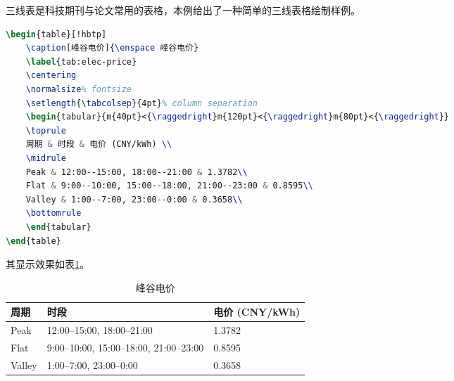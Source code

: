 \begin{example}三线表是科技期刊与论文常用的表格，本例给出了一种简单的三线表格绘制样例。
\begin{lstlisting}[language=tex]
\begin{table}[!hbtp]
    \caption[峰谷电价]{\enspace 峰谷电价}
    \label{tab:elec-price}
    \centering
    \normalsize% fontsize 
    \setlength{\tabcolsep}{4pt}% column separation
    \begin{tabular}{m{40pt}<{\raggedright}m{120pt}<{\raggedright}m{80pt}<{\raggedright}}
    \toprule
    周期 & 时段 & 电价 (CNY/kWh) \\
    \midrule
    Peak & 12:00--15:00, 18:00--21:00 & 1.3782\\
    Flat & 9:00--10:00, 15:00--18:00, 21:00--23:00 & 0.8595\\
    Valley & 1:00--7:00, 23:00--0:00 & 0.3658\\
    \bottomrule
    \end{tabular}
\end{table}
\end{lstlisting}
其显示效果如表\ref{tab:elec-price}。
\end{example}
\begin{table}[!hbtp]
    \caption[峰谷电价]{\enspace 峰谷电价}
    \label{tab:elec-price}
    \centering
    \normalsize%
    \setlength{\tabcolsep}{4pt}%
    \begin{tabular}{m{40pt}<{\raggedright}m{120pt}<{\raggedright}m{80pt}<{\raggedright}}
    \toprule
    周期 & 时段 & 电价 (CNY/kWh) \\
    \midrule
    Peak & 12:00--15:00, 18:00--21:00 & 1.3782\\
    Flat & 9:00--10:00, 15:00--18:00, 21:00--23:00 & 0.8595\\
    Valley & 1:00--7:00, 23:00--0:00 & 0.3658\\
    \bottomrule
    \end{tabular}
\end{table}


